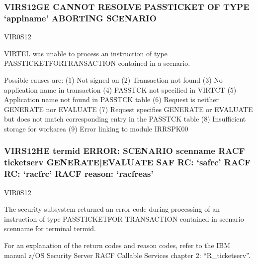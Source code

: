 \documentclass[letterpaper,10pt,english]{sphinxmanual}
\begin{document}
\subsubsection{VIRS12GE CANNOT RESOLVE PASSTICKET OF TYPE ‘applname’ ABORTING SCENARIO}
\label{\detokenize{messages:virs12ge-cannot-resolve-passticket-of-type-applname-aborting-scenario}}\begin{description}
\sphinxAtStartPar
VIR0S12

\sphinxAtStartPar
VIRTEL was unable to process an instruction of type PASSTICKET\sphinxhyphen{}FOR\sphinxhyphen{}TRANSACTION contained in a scenario.

\sphinxAtStartPar
Possible causes are: (1) Not signed on (2) Transaction not found (3) No application name in transaction (4) PASSTCK not specified in VIRTCT (5) Application name not found in PASSTCK table (6) Request is neither GENERATE nor EVALUATE (7) Request specifies GENERATE or EVALUATE but does not match corresponding entry in the PASSTCK table (8) Insufficient storage for workarea (9) Error linking to module IRRSPK00

\end{description}


\subsubsection{VIRS12HE termid ERROR: SCENARIO scenname RACF ticketserv GENERATE|EVALUATE SAF RC: ‘safrc’ RACF RC: ‘racfrc’ RACF reason: ‘racfreas’}
\label{\detokenize{messages:virs12he-termid-error-scenario-scenname-racf-ticketserv-generate-evaluate-saf-rc-safrc-racf-rc-racfrc-racf-reason-racfreas}}\begin{description}
\sphinxAtStartPar
VIR0S12

\sphinxAtStartPar
The security subsystem returned an error code during processing of an instruction of type PASSTICKET\sphinxhyphen{}FOR\sphinxhyphen{} TRANSACTION contained in scenario scenname for terminal termid.

\sphinxAtStartPar
For an explanation of the return codes and reason codes, refer to the IBM manual z/OS Security Server RACF Callable Services chapter 2: “R\_ticketserv”.

\end{description}
\end{document}
